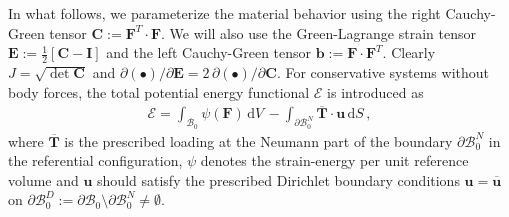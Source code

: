 \documentclass[AMA,STIX1COL]{WileyNJD-v2}
\newcommand*{\gz}[1]{\boldsymbol{#1}}
\renewcommand*{\d}{\mathrm{d}}
\newcommand*{\mcl}[1]{\mathcal{#1}}
\begin{document}
In what follows, we parameterize the material behavior using the right Cauchy-Green tensor $\gz C := \gz F^T \cdot \gz F$.
We will also use the Green-Lagrange strain tensor $\gz E:=\frac{1}{2}\left[\gz C - \gz I\right]$ and the left Cauchy-Green tensor $\gz b := \gz F \cdot \gz F^T$.
Clearly $J = \sqrt{\det \gz C}$ and $\partial (\bullet)/\partial \gz E = 2\, \partial (\bullet)/\partial \gz C$.
%
For conservative systems without body forces, the total potential energy functional $\mcl E$ is introduced as
\begin{align}
\mcl E =
\int_{\mcl B_0} \psi(\gz F) \, \d V \,
- \int_{\partial \mcl B_0^N} \overline{\gz T} \cdot \gz u \, \d S \, ,
\end{align}
where $\overline{\gz T}$ is the prescribed loading at the Neumann part of the boundary $\partial \mcl B_0^N$ in the referential configuration, $\psi$ denotes the strain-energy per unit reference volume and $\gz u$ should satisfy the prescribed Dirichlet boundary conditions $\gz u = \overline{\gz u}$ on $\partial \mcl B_0^D := \partial \mcl B_0 \setminus \partial \mcl B_0^N \neq \emptyset $.
\end{document}
